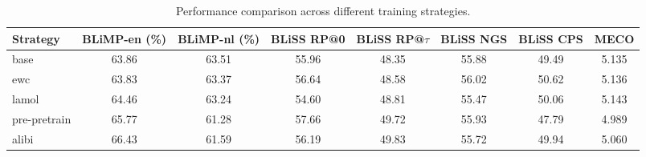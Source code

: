 \begin{table}[!ht]
\small
\centering
\begin{tabular}{lccccccc}
\hline
Strategy & BLiMP-en (\%) & BLiMP-nl (\%) & BLiSS RP@0 & BLiSS RP@$\tau$ & BLiSS NGS & BLiSS CPS & MECO \\
\hline
base& 63.86 & 63.51 & 55.96 & 48.35 & 55.88 & 49.49 & 5.135 \\
ewc & 63.83 & 63.37 & 56.64 & 48.58 & 56.02 & 50.62 & 5.136 \\
lamol & 64.46 & 63.24 & 54.60 & 48.81 & 55.47 & 50.06 & 5.143 \\
pre-pretrain & 65.77 & 61.28 & 57.66 & 49.72 & 55.93 & 47.79 & 4.989 \\
alibi & 66.43 & 61.59 & 56.19 & 49.83 & 55.72 & 49.94 & 5.060 \\
\hline
\end{tabular}
\caption{Performance comparison across different training strategies.}
\label{tab:strategy_results}
\end{table}





